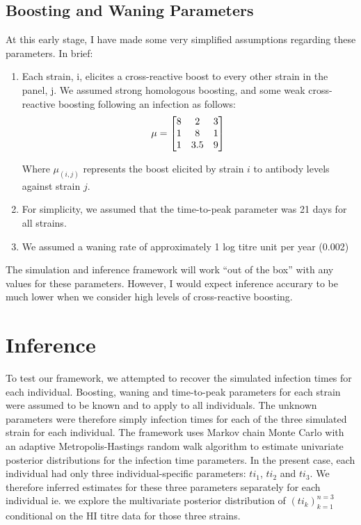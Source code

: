 \documentclass[a4paper,11pt,twoside]{article}
\begin{document}
\subsection{Boosting and Waning Parameters}
At this early stage, I have made some very simplified assumptions regarding these parameters. In brief:
\begin{enumerate}
\item Each strain, i, elicites a cross-reactive boost to every other strain in the panel, j. We assumed strong homologous boosting, and some weak cross-reactive boosting following an infection as follows:
\[\mu = \begin{bmatrix}
8 & 2 & 3 \\
1 & 8 & 1 \\
1 & 3.5 & 9 \\
\end{bmatrix}\\
\]


Where $\mu_{(i,j)}$ represents the boost elicited by strain $i$ to antibody levels against strain $j$.
\item For simplicity, we assumed that the time-to-peak parameter was 21 days for all strains.
\item We assumed a waning rate of approximately 1 log titre unit per year (0.002)
\end{enumerate}
The simulation and inference framework will work ``out of the box'' with any values for these parameters. However, I would expect inference accurary to be much lower when we consider high levels of cross-reactive boosting.

\section{Inference}
To test our framework, we attempted to recover the simulated infection times for each individual. Boosting, waning and time-to-peak parameters for each strain were assumed to be known and to apply to all individuals. The unknown parameters were therefore simply infection times for each of the three simulated strain for each individual. The framework uses Markov chain Monte Carlo with an adaptive Metropolis-Hastings random walk algorithm to estimate univariate posterior distributions for the infection time parameters. In the present case, each individual had only three individual-specific parameters: $ti_1$, $ti_2$ and $ti_3$. We therefore inferred estimates for these three parameters separately for each individual ie. we explore the multivariate posterior distribution of $(ti_k)_{k=1}^{n=3}$ conditional on the HI titre data for those three strains.
\end{document}
